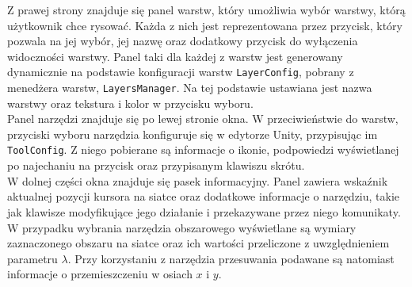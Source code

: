 Z prawej strony znajduje się panel warstw, który umożliwia wybór warstwy, którą użytkownik chce rysować.
Każda z nich jest reprezentowana przez przycisk, który pozwala na jej wybór,
jej nazwę oraz dodatkowy przycisk do wyłączenia widoczności warstwy.
Panel taki dla każdej z warstw jest generowany dynamicznie na podstawie konfiguracji warstw \texttt{LayerConfig},
pobrany z menedżera warstw, \texttt{LayersManager}.
Na tej podstawie ustawiana jest nazwa warstwy oraz tekstura i kolor w przycisku wyboru.\\
Panel narzędzi znajduje się po lewej stronie okna.
W przeciwieństwie do warstw, przyciski wyboru narzędzia konfiguruje się w edytorze Unity,
przypisując im \texttt{ToolConfig}.
Z niego pobierane są informacje o ikonie,
podpowiedzi wyświetlanej po najechaniu na przycisk oraz przypisanym klawiszu skrótu.\\
\indent W dolnej części okna znajduje się pasek informacyjny.
Panel zawiera wskaźnik aktualnej pozycji kursora na siatce oraz dodatkowe informacje o narzędziu,
takie jak klawisze modyfikujące jego działanie i przekazywane przez niego komunikaty.
W przypadku wybrania narzędzia obszarowego wyświetlane są wymiary zaznaczonego obszaru na siatce
oraz ich wartości przeliczone z uwzględnieniem parametru $\lambda$.
Przy korzystaniu z narzędzia przesuwania podawane są natomiast informacje o przemieszczeniu w osiach $x$ i $y$.
